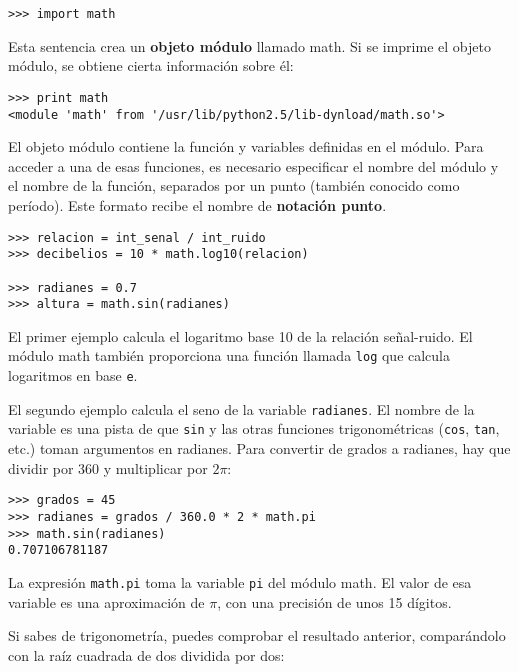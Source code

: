 \beforeverb
\begin{verbatim}
>>> import math
\end{verbatim}
\afterverb
%
Esta sentencia crea un {\bf objeto módulo} llamado math. Si
se imprime el objeto módulo, se obtiene cierta información sobre él:

\beforeverb
\begin{verbatim}
>>> print math
<module 'math' from '/usr/lib/python2.5/lib-dynload/math.so'>
\end{verbatim}
\afterverb
%
El objeto módulo contiene la función y variables definidas en el módulo.
Para acceder a una de esas funciones, es necesario especificar el nombre
del módulo y el nombre de la función, separados por un punto (también
conocido como período). Este formato recibe el nombre de {\bf notación punto}.


\beforeverb
\begin{verbatim}
>>> relacion = int_senal / int_ruido
>>> decibelios = 10 * math.log10(relacion)

>>> radianes = 0.7
>>> altura = math.sin(radianes)
\end{verbatim}
\afterverb
%
El primer ejemplo calcula el logaritmo base 10 de la
relación señal-ruido. El módulo math también proporciona una
función llamada {\tt log} que calcula logaritmos en base {\tt e}.


El segundo ejemplo calcula el seno de la variable {\tt radianes}. El nombre de la
variable es una pista de que {\tt sin} y las otras funciones
trigonométricas ({\tt cos}, {\tt tan}, etc.) toman argumentos en radianes.
Para convertir de grados a radianes, hay que dividir por 360 y multiplicar por
$2\pi$:

\beforeverb
\begin{verbatim}
>>> grados = 45
>>> radianes = grados / 360.0 * 2 * math.pi
>>> math.sin(radianes)
0.707106781187
\end{verbatim}
\afterverb
%
La expresión {\tt math.pi} toma la variable {\tt pi} del módulo math.
El valor de esa variable es una aproximación de
$\pi$, con una precisión de unos 15 dígitos.


Si sabes de
trigonometría, puedes comprobar el resultado anterior, comparándolo con
la raíz cuadrada de dos dividida por dos:

